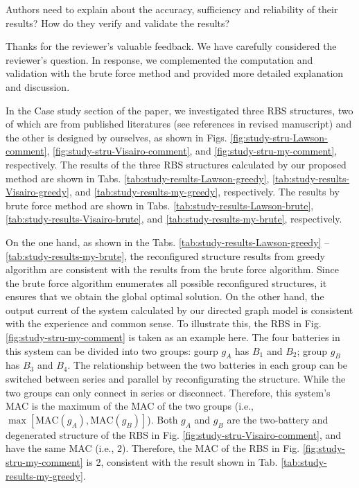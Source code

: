 \begin{revcomment}
  Authors need to explain about the accuracy, sufficiency and reliability of their results? How do they verify and validate the results?
\end{revcomment}
\begin{revresponse}

Thanks for the reviewer's valuable feedback. 
We have carefully considered the reviewer's question.
In response, we complemented the computation and validation with the brute force method and provided more detailed explanation and discussion.


In the Case study section of the paper, we investigated three RBS structures, two of which are from published literatures (see references \cite{lawsonSoftwareConfigurableBattery2012,visairoReconfigurableBatteryPack2008} in revised manuscript) and the other is designed by ourselves, as shown in Figs. \ref{fig:study-stru-Lawson-comment}, \ref{fig:study-stru-Visairo-comment}, and \ref{fig:study-stru-my-comment}, respectively.
The results of the three RBS structures calculated by our proposed method are shown in Tabs. \ref{tab:study-results-Lawson-greedy}, \ref{tab:study-results-Visairo-greedy}, and \ref{tab:study-results-my-greedy}, respectively.
The results by brute force method are shown in Tabs. \ref{tab:study-results-Lawson-brute}, \ref{tab:study-results-Visairo-brute}, and \ref{tab:study-results-my-brute}, respectively.


On the one hand, as shown in the Tabs. \ref{tab:study-results-Lawson-greedy} -- \ref{tab:study-results-my-brute}, the reconfigured structure results from greedy algorithm are consistent with the results from the brute force algorithm.
Since the brute force algorithm enumerates all possible reconfigured structures, it ensures that we obtain the global optimal solution.
On the other hand, the output current of the system calculated by our directed graph model is consistent with the experience and common sense.
To illustrate this, the RBS in Fig. \ref{fig:study-stru-my-comment} is taken as an example here.
The four batteries in this system can be divided into two groups: gourp $g_A$ has $B_1$ and $B_2$; group $g_B$ has $B_3$ and $B_4$.
The relationship between the two batteries in each group can be switched between series and parallel by reconfigurating the structure.
While the two groups can only connect in series or disconnect.
Therefore, this system's MAC is the maximum of the MAC of the two groups (i.e., $\max[\text{MAC}(g_A),\text{MAC}(g_B)]$).
Both $g_A$ and $g_B$ are the two-battery and degenerated structure of the RBS in Fig. \ref{fig:study-stru-Visairo-comment}, and have the same MAC (i.e., 2).
Therefore, the MAC of the RBS in Fig. \ref{fig:study-stru-my-comment} is 2, consistent with the result shown in Tab. \ref{tab:study-results-my-greedy}.



\end{revresponse}
